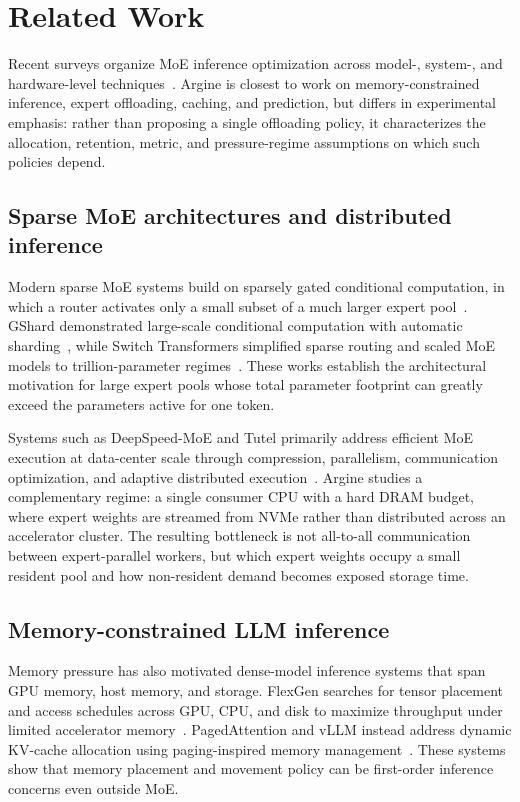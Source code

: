 \section{Related Work}
\label{sec:related-work}

Recent surveys organize MoE inference optimization across model-, system-, and hardware-level techniques~\cite{liu2026survey}. Argine is closest to work on memory-constrained inference, expert offloading, caching, and prediction, but differs in experimental emphasis: rather than proposing a single offloading policy, it characterizes the allocation, retention, metric, and pressure-regime assumptions on which such policies depend.

\subsection{Sparse MoE architectures and distributed inference}

Modern sparse MoE systems build on sparsely gated conditional computation, in which a router activates only a small subset of a much larger expert pool~\cite{shazeer2017sparsely}. GShard demonstrated large-scale conditional computation with automatic sharding~\cite{lepikhin2020gshard}, while Switch Transformers simplified sparse routing and scaled MoE models to trillion-parameter regimes~\cite{fedus2022switch}. These works establish the architectural motivation for large expert pools whose total parameter footprint can greatly exceed the parameters active for one token.

Systems such as DeepSpeed-MoE and Tutel primarily address efficient MoE execution at data-center scale through compression, parallelism, communication optimization, and adaptive distributed execution~\cite{rajbhandari2022deepspeedmoe,hwang2023tutel}. Argine studies a complementary regime: a single consumer CPU with a hard DRAM budget, where expert weights are streamed from NVMe rather than distributed across an accelerator cluster. The resulting bottleneck is not all-to-all communication between expert-parallel workers, but which expert weights occupy a small resident pool and how non-resident demand becomes exposed storage time.

\subsection{Memory-constrained LLM inference}

Memory pressure has also motivated dense-model inference systems that span GPU memory, host memory, and storage. FlexGen searches for tensor placement and access schedules across GPU, CPU, and disk to maximize throughput under limited accelerator memory~\cite{sheng2023flexgen}. PagedAttention and vLLM instead address dynamic KV-cache allocation using paging-inspired memory management~\cite{kwon2023pagedattention}. These systems show that memory placement and movement policy can be first-order inference concerns even outside MoE.

